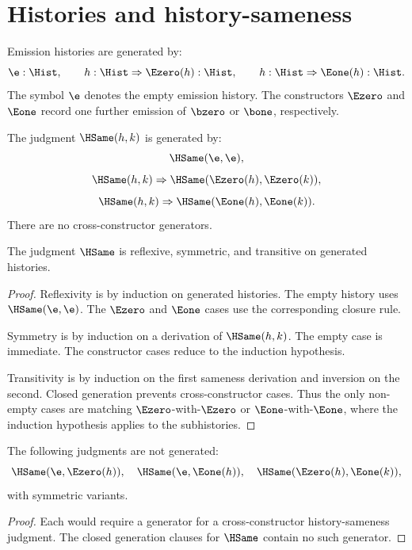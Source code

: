 \section{Histories and history-sameness}

\begin{definition}
Emission histories are generated by:
$$
\e : \Hist,
\qquad
h:\Hist \Rightarrow \Ezero(h):\Hist,
\qquad
h:\Hist \Rightarrow \Eone(h):\Hist.
$$
The symbol \(\e\) denotes the empty emission history.  The constructors \(\Ezero\) and \(\Eone\) record one further emission of \(\bzero\) or \(\bone\), respectively.
\end{definition}

\begin{definition}
The judgment \(\HSame(h,k)\) is generated by:
$$
\HSame(\e,\e),
$$
$$
\HSame(h,k)\Rightarrow \HSame(\Ezero(h),\Ezero(k)),
$$
$$
\HSame(h,k)\Rightarrow \HSame(\Eone(h),\Eone(k)).
$$
There are no cross-constructor generators.
\end{definition}

\begin{theorem}
The judgment \(\HSame\) is reflexive, symmetric, and transitive on generated histories.
\end{theorem}
\begin{proof}
Reflexivity is by induction on generated histories.  The empty history uses \(\HSame(\e,\e)\).  The \(\Ezero\) and \(\Eone\) cases use the corresponding closure rule.

Symmetry is by induction on a derivation of \(\HSame(h,k)\).  The empty case is immediate.  The constructor cases reduce to the induction hypothesis.

Transitivity is by induction on the first sameness derivation and inversion on the second.  Closed generation prevents cross-constructor cases.  Thus the only non-empty cases are matching \(\Ezero\)-with-\(\Ezero\) or \(\Eone\)-with-\(\Eone\), where the induction hypothesis applies to the subhistories.
\end{proof}

\begin{theorem}
\label{thm:proof-sprint-history-no-confusion}
The following judgments are not generated:
$$
\HSame(\e,\Ezero(h)),\quad
\HSame(\e,\Eone(h)),\quad
\HSame(\Ezero(h),\Eone(k)),
$$
with symmetric variants.
\end{theorem}
\begin{proof}
Each would require a generator for a cross-constructor history-sameness judgment.  The closed generation clauses for \(\HSame\) contain no such generator.
\end{proof}

